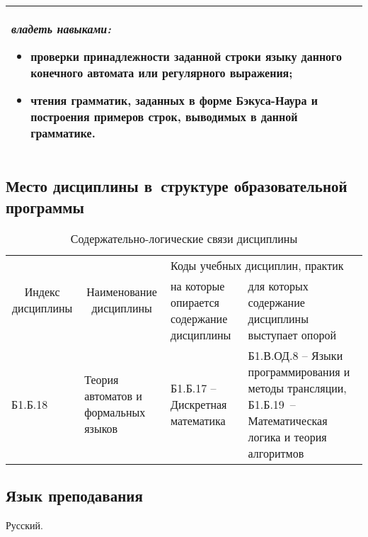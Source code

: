 \documentclass[a4paper,12pt]{article}
\begin{document}
\begin{longtable}{|p{54mm}|p{100mm}|}
  \emph{владеть навыками:}
  \begin{itemize}[leftmargin=12pt]
    \item проверки принадлежности заданной строки языку данного конечного автомата или регулярного выражения; 
    \item чтения грамматик, заданных в форме Бэкуса-Наура и построения примеров строк, выводимых в данной грамматике. 
  \end{itemize}
  
  \\
  \hline
  \end{longtable}


\subsection{Место дисциплины в~структуре образовательной программы}

  \begin{table}[H]
  \setlength\arraycolsep{3pt}
  \caption{Содержательно-логические связи дисциплины}
  \begin{tabular}{|l|p{18ex}|*{2}{p{23ex}|}}
  \hline
  \multicolumn{1}{|c|}{\multirow{2}{13ex}{\centering Индекс \linebreak дисциплины}} &
  \multicolumn{1}{c|}{\multirow{2}{18ex}{\centering Наименование \linebreak дисциплины}} & 
  \multicolumn{2}{p{46ex}|}{\centering Коды учебных дисциплин, практик} \\
  \cline{3-4}
   & & 
  \centering на которые опирается содержание дисциплины & 
  \centering\arraybackslash для которых содержание дисциплины выступает опорой
  \\ \hline
  Б1.Б.18 & Теория автоматов и формальных языков 
  & 
  \raggedright
  
  Б1.Б.17 -- Дискретная математика 
  & 
  \raggedright\arraybackslash
  
  Б1.В.ОД.8 -- Языки программирования и методы трансляции,
  Б1.Б.19~-- Математическая логика и теория алгоритмов 
  \\ \hline
  \end{tabular}
  \end{table}


\subsection{Язык преподавания} 
  Русский.
  



\newpage
\end{document}
